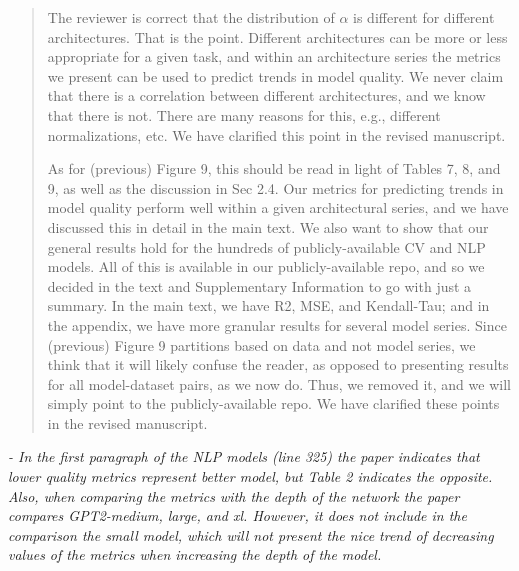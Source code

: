 \documentclass[11pt]{article}
\begin{document}
\begin{quote}
The reviewer is correct that the distribution of $\alpha$ is different for different architectures.
That is the point.
Different architectures can be more or less appropriate for a given task, and within an architecture series the metrics we present can be used to predict trends in model quality.
We never claim that there is a correlation between different architectures, and we know that there is not.
There are many reasons for this, e.g., different normalizations, etc.
We have clarified this point
in the revised manuscript.

As for (previous) Figure 9, this should be read in light of Tables 7, 8, and 9, as well as the discussion in Sec 2.4.  
Our metrics for predicting trends in model quality perform well within a given architectural series, and we have discussed this in detail in the main text.
We also want to show that our general results hold for the hundreds of publicly-available CV and NLP models.
All of this is available in our publicly-available repo, and so we decided in the text and Supplementary Information to go with just a summary.
In the main text, we have R2, MSE, and Kendall-Tau; and in the appendix, we have more granular results for several model series.
Since (previous) Figure 9 partitions based on data and not model series, we think that it will likely confuse the reader, as opposed to presenting results for all model-dataset pairs, as we now do.
Thus, we removed it, and we will simply point to the publicly-available repo.
%
We have clarified these points
in the revised manuscript.

\end{quote}

\noindent
\emph{%
- In the first paragraph of the NLP models (line 325) the paper indicates that lower quality metrics represent better model, but Table 2 indicates the opposite. Also, when comparing the metrics with the depth of the network the paper compares GPT2-medium, large, and xl. However, it does not include in the comparison the small model, which will not present the nice trend of decreasing values of the metrics when increasing the depth of the model.
}
\end{document}
